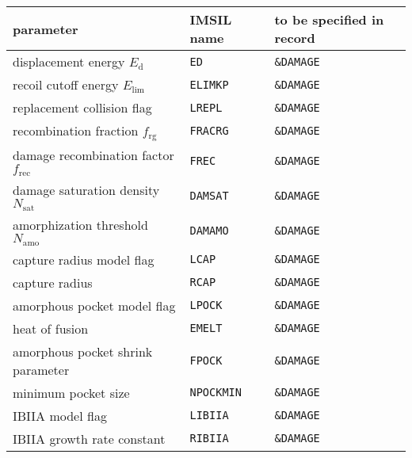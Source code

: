 \begin{center}
\begin{tabular}{lll}
   parameter \quad  & IMSIL name & to be specified in record \\
   \hline
   displacement energy $E_\mathrm{d}$         & {\tt ED}     & {\tt \&DAMAGE} \\
   recoil cutoff energy $E_\mathrm{lim}$      & {\tt ELIMKP} & {\tt \&DAMAGE} \\
   replacement collision flag                 & {\tt LREPL}  & {\tt \&DAMAGE} \\
   recombination fraction $f_\mathrm{rg}$     & {\tt FRACRG} & {\tt \&DAMAGE} \\
   damage recombination factor $f_\mathrm{rec}$ & {\tt FREC} & {\tt \&DAMAGE} \\
   damage saturation density $N_\mathrm{sat}$ & {\tt DAMSAT} & {\tt \&DAMAGE} \\
   amorphization threshold $N_\mathrm{amo}$   & {\tt DAMAMO} & {\tt \&DAMAGE} \\
   capture radius model flag                  & {\tt LCAP}   & {\tt \&DAMAGE} \\
   capture radius                             & {\tt RCAP}   & {\tt \&DAMAGE} \\
   amorphous pocket model flag                & {\tt LPOCK}  & {\tt \&DAMAGE} \\
   heat of fusion                             & {\tt EMELT}  & {\tt \&DAMAGE} \\
   amorphous pocket shrink parameter          & {\tt FPOCK}  & {\tt \&DAMAGE} \\
   minimum pocket size                      & {\tt NPOCKMIN} & {\tt \&DAMAGE} \\
   IBIIA model flag                           & {\tt LIBIIA} & {\tt \&DAMAGE} \\
   IBIIA growth rate constant                 & {\tt RIBIIA} & {\tt \&DAMAGE} \\
\end{tabular}
\end{center}
